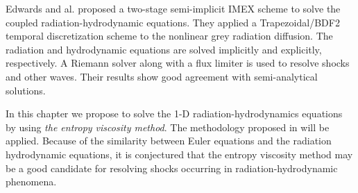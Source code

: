 Edwards and al. \cite{EdwardsMorelLowrie} proposed a two-stage semi-implicit IMEX scheme to solve the coupled radiation-hydrodynamic equations. They applied a Trapezoidal/BDF2 temporal discretization scheme to the nonlinear grey radiation diffusion. The radiation and hydrodynamic equations are solved implicitly and explicitly, respectively. A Riemann solver along with a flux limiter is used to resolve shocks and other waves. Their results show good agreement with semi-analytical solutions. 

In this chapter we propose to solve the 1-D radiation-hydrodynamics equations by using \emph{the entropy viscosity method}. The methodology proposed in  will be applied.
Because of the similarity between Euler equations and the radiation hydrodynamic equations, it is conjectured that the entropy viscosity method may be a good candidate for resolving shocks occurring in radiation-hydrodynamic phenomena.

